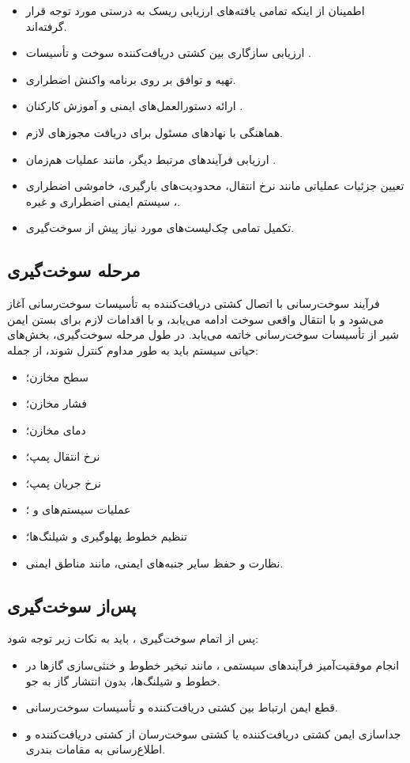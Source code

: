 \begin{itemize}
	\item اطمینان از اینکه تمامی یافته‌های ارزیابی ریسک به درستی مورد توجه قرار گرفته‌اند.
	\item ارزیابی سازگاری بین کشتی دریافت‌کننده سوخت و تأسیسات .
	\item تهیه و توافق بر روی برنامه واکنش اضطراری.
	\item ارائه دستورالعمل‌های ایمنی و آموزش کارکنان .
	\item هماهنگی با نهادهای مسئول برای دریافت مجوزهای لازم.
	\item ارزیابی فرآیندهای مرتبط دیگر، مانند عملیات هم‌زمان .
	\item تعیین جزئیات عملیاتی مانند نرخ انتقال، محدودیت‌های بارگیری،  
	خاموشی اضطراری
	، سیستم ایمنی اضطراری
	و غیره.
	\item تکمیل تمامی چک‌لیست‌های مورد نیاز پیش از سوخت‌گیری.
\end{itemize}

\subsection{مرحله سوخت‌گیری}

فرآیند سوخت‌رسانی
 با اتصال کشتی دریافت‌کننده به تأسیسات سوخت‌رسانی آغاز می‌شود و با انتقال واقعی سوخت ادامه می‌یابد، و با اقدامات لازم برای بستن ایمن شیر از تأسیسات سوخت‌رسانی خاتمه می‌یابد.  
در طول مرحله سوخت‌گیری، بخش‌های حیاتی سیستم باید به طور مداوم کنترل شوند، از جمله:

\begin{itemize}
	\item سطح مخازن؛
	\item فشار مخازن؛
	\item دمای مخازن؛
	\item نرخ انتقال پمپ؛
	\item نرخ جریان پمپ؛
	\item عملیات سیستم‌های  و ؛
	\item تنظیم خطوط پهلوگیری و شیلنگ‌ها؛
	\item نظارت و حفظ سایر جنبه‌های ایمنی، مانند مناطق ایمنی.
\end{itemize}

\subsection{پس‌از سوخت‌گیری}
پس از اتمام سوخت‌گیری
، باید به نکات زیر توجه شود:
\begin{itemize}
	\item انجام موفقیت‌آمیز فرآیندهای سیستمی ، مانند تبخیر خطوط و خنثی‌سازی گازها در خطوط و شیلنگ‌ها، بدون انتشار گاز به جو.
	\item قطع ایمن ارتباط بین کشتی دریافت‌کننده و تأسیسات سوخت‌رسانی.
	\item جداسازی ایمن کشتی دریافت‌کننده یا کشتی سوخت‌رسان از کشتی دریافت‌کننده و اطلاع‌رسانی به مقامات بندری.
\end{itemize}

